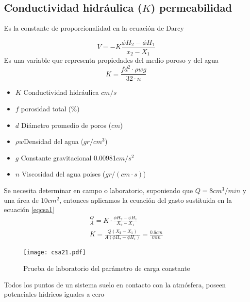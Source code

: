     \subsection{Conductividad hidráulica ($K$) permeabilidad}
    \begin{definition}
        Es la constante de proporcionalidad en la ecuación de Darcy
    \end{definition}
    \begin{equation}
        V =- K\frac{\phi H_2 -\phi H_1}{x_2 - X_1}
        \label{eqcsa1}
    \end{equation}
Es una variable que representa propiedades del medio poroso y del agua
    \begin{equation}
        K =\frac{fd^2\cdot \rho w g}{32\cdot n}
    \end{equation}
    \begin{notation}
        \begin{itemize}
            \item $K$ Conductividad hidráulica $cm/s$
            \item $f$ porosidad total (\%)
            \item $d$ Diámetro promedio de poros ($cm$)
            \item $\rho w$Densidad del agua ($gr/cm^3$)
            \item $g$ Constante gravitacional 0.00981$cm/s^2$
            \item $n$ Viscosidad del agua poises ($gr/(cm\cdot s)$)
        \end{itemize}
    \end{notation}
    Se necesita determinar en campo o laboratorio, suponiendo que $Q=8cm^3/min$ y una área de $10cm^2$, entonces aplicamos la ecuación del gasto sustituida en la ecuación \eqref{eqcsa1}
    \begin{align*}
        \frac{Q}{A} = K\cdot\frac{\phi H_2 -\phi H_1}{X_2 - X_1}\\
        K =\frac{Q\left(X_2 - X_1\right)}{A\left(\phi H_2 -\phi H_1\right)} = \frac{0.6cm}{min}
    \end{align*}
    \begin{figure}[h!]
    \centering
      \texttt{[image: csa21.pdf]}
      \caption{Prueba de laboratorio del parámetro de carga constante}
      \label{csa21}
    \end{figure}
    Todos los puntos de un sistema suelo en contacto con la atmósfera, poseen potenciales hídricos iguales a cero 
    
